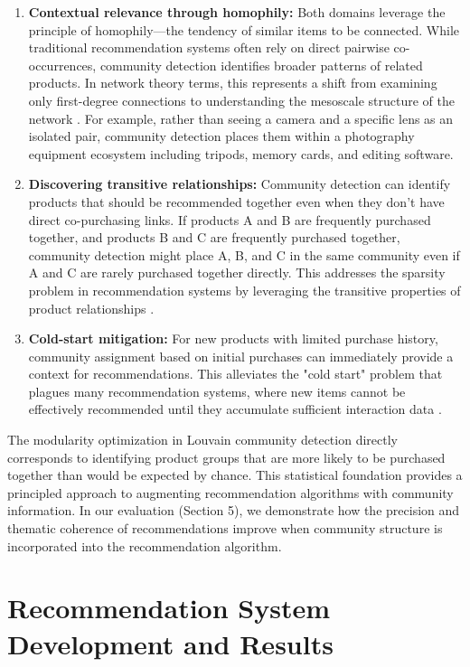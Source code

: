 \documentclass[conference]{IEEEtran}
\begin{document}
\begin{enumerate}
    \item \textbf{Contextual relevance through homophily:} Both domains leverage the principle of homophily—the tendency of similar items to be connected. While traditional recommendation systems often rely on direct pairwise co-occurrences, community detection identifies broader patterns of related products. In network theory terms, this represents a shift from examining only first-degree connections to understanding the mesoscale structure of the network \cite{huang2007applying}. For example, rather than seeing a camera and a specific lens as an isolated pair, community detection places them within a photography equipment ecosystem including tripods, memory cards, and editing software.
    
    \item \textbf{Discovering transitive relationships:} Community detection can identify products that should be recommended together even when they don't have direct co-purchasing links. If products A and B are frequently purchased together, and products B and C are frequently purchased together, community detection might place A, B, and C in the same community even if A and C are rarely purchased together directly. This addresses the sparsity problem in recommendation systems by leveraging the transitive properties of product relationships \cite{sarwar2001item}.
    
    \item \textbf{Cold-start mitigation:} For new products with limited purchase history, community assignment based on initial purchases can immediately provide a context for recommendations. This alleviates the "cold start" problem that plagues many recommendation systems, where new items cannot be effectively recommended until they accumulate sufficient interaction data \cite{ricci2011introduction}.
\end{enumerate}

The modularity optimization in Louvain community detection directly corresponds to identifying product groups that are more likely to be purchased together than would be expected by chance. This statistical foundation provides a principled approach to augmenting recommendation algorithms with community information. In our evaluation (Section 5), we demonstrate how the precision and thematic coherence of recommendations improve when community structure is incorporated into the recommendation algorithm.

\section{Recommendation System Development and Results}
\end{document}
